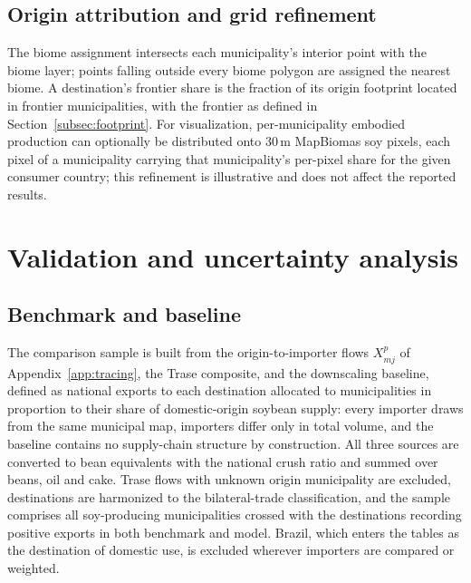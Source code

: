 \subsection{Origin attribution and grid refinement}\label{subsubsec:attribution}
The biome assignment intersects each municipality's interior point with
the biome layer; points falling outside every biome polygon are assigned
the nearest biome. A destination's frontier share is the fraction of its
origin footprint located in frontier municipalities, with the frontier as
defined in Section~\ref{subsec:footprint}. For visualization, per-municipality embodied production can
optionally be distributed onto 30\,m MapBiomas soy pixels, each pixel of a
municipality carrying that municipality's per-pixel share for the given
consumer country; this refinement is illustrative and does not affect the
reported results.

\section{Validation and uncertainty analysis}\label{app:validation}

\subsection{Benchmark and baseline}\label{subsubsec:benchmarks}
The comparison sample is built from the origin-to-importer flows
$X^p_{mj}$ of Appendix~\ref{app:tracing}, the Trase composite, and the
downscaling baseline, defined as national exports to each destination
allocated to municipalities in proportion to their share of
domestic-origin soybean supply: every importer draws from the same
municipal map, importers differ only in total volume, and the baseline
contains no supply-chain structure by construction. All three sources
are converted to bean equivalents with the national crush ratio and
summed over beans, oil and cake. Trase flows with unknown origin
municipality are excluded, destinations are harmonized to the
bilateral-trade classification, and the sample comprises all
soy-producing municipalities crossed with the destinations recording
positive exports in both benchmark and model. Brazil, which enters the
tables as the destination of domestic use, is excluded wherever
importers are compared or weighted.

